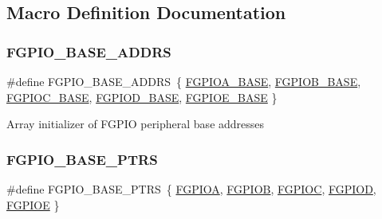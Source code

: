 \subsection{Macro Definition Documentation}
\mbox{\label{group___f_g_p_i_o___peripheral___access___layer_ga4bd60cd4bdf238ff321195acb421b187}} 
\subsubsection{\texorpdfstring{FGPIO\_BASE\_ADDRS}{FGPIO\_BASE\_ADDRS}}
{\footnotesize\ttfamily \#define F\+G\+P\+I\+O\+\_\+\+B\+A\+S\+E\+\_\+\+A\+D\+D\+RS~\{ \mbox{\hyperlink{group___f_g_p_i_o___peripheral___access___layer_ga5be504106abad77cbd9d7d05bce089bb}{F\+G\+P\+I\+O\+A\+\_\+\+B\+A\+SE}}, \mbox{\hyperlink{group___f_g_p_i_o___peripheral___access___layer_gae82f132d064f5a999cb0191619628cd4}{F\+G\+P\+I\+O\+B\+\_\+\+B\+A\+SE}}, \mbox{\hyperlink{group___f_g_p_i_o___peripheral___access___layer_ga5a8489a84c23b5ff6aae4e0d3048c861}{F\+G\+P\+I\+O\+C\+\_\+\+B\+A\+SE}}, \mbox{\hyperlink{group___f_g_p_i_o___peripheral___access___layer_ga5b3caca7e9c439b235d8390e79731b88}{F\+G\+P\+I\+O\+D\+\_\+\+B\+A\+SE}}, \mbox{\hyperlink{group___f_g_p_i_o___peripheral___access___layer_ga2de7ad1c5fbb15d6ffaecdc3b4653774}{F\+G\+P\+I\+O\+E\+\_\+\+B\+A\+SE}} \}}

Array initializer of F\+G\+P\+IO peripheral base addresses \mbox{\label{group___f_g_p_i_o___peripheral___access___layer_ga58956e4d0a0ffec3e1dd70e77a5160b4}} 
\subsubsection{\texorpdfstring{FGPIO\_BASE\_PTRS}{FGPIO\_BASE\_PTRS}}
{\footnotesize\ttfamily \#define F\+G\+P\+I\+O\+\_\+\+B\+A\+S\+E\+\_\+\+P\+T\+RS~\{ \mbox{\hyperlink{group___f_g_p_i_o___peripheral___access___layer_gae9c9828758a8c2a392181efa5f88ff23}{F\+G\+P\+I\+OA}}, \mbox{\hyperlink{group___f_g_p_i_o___peripheral___access___layer_gab6c2eaacd50ab03a400e2cf6fcff5e62}{F\+G\+P\+I\+OB}}, \mbox{\hyperlink{group___f_g_p_i_o___peripheral___access___layer_ga587b64f3ba8e092c9b25a04c4129c6ae}{F\+G\+P\+I\+OC}}, \mbox{\hyperlink{group___f_g_p_i_o___peripheral___access___layer_ga1a5d3d931f255610ab606286b6f50690}{F\+G\+P\+I\+OD}}, \mbox{\hyperlink{group___f_g_p_i_o___peripheral___access___layer_ga3692c54389ee20cfac5582c942daffc9}{F\+G\+P\+I\+OE}} \}}

